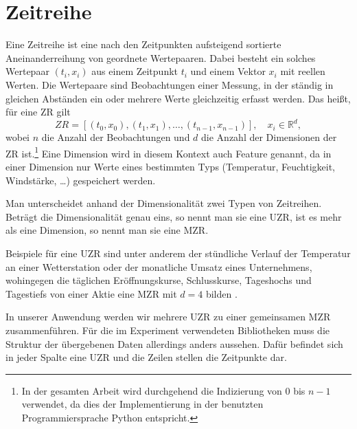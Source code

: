 \section{Zeitreihe}
Eine Zeitreihe ist eine nach den Zeitpunkten aufsteigend sortierte Aneinanderreihung von geordnete Wertepaaren. Dabei besteht ein solches Wertepaar $(t_i, x_i)$ aus einem Zeitpunkt $t_i$ und einem Vektor $x_i$ mit reellen Werten. Die Wertepaare sind Beobachtungen einer Messung, in der ständig in gleichen Abständen ein oder mehrere Werte gleichzeitig erfasst werden. Das heißt, für eine \ac{ZR} gilt 
\[ZR=[(t_0,x_0),(t_1,x_1),\ldots,(t_{n-1},x_{n-1})], \quad x_i \in \mathbb{R}^d,\]
wobei $n$ die Anzahl der Beobachtungen und $d$ die Anzahl der Dimensionen der \acs{ZR} ist.\footnote{In der gesamten Arbeit wird durchgehend die Indizierung von 0 bis $n-1$ verwendet, da dies der Implementierung in der benutzten Programmiersprache Python entspricht.}\label{foot:indexe} Eine Dimension wird in diesem Kontext auch Feature genannt, da in einer Dimension nur Werte eines bestimmten Typs (Temperatur, Feuchtigkeit, Windstärke, \dots) gespeichert werden.

Man unterscheidet anhand der Dimensionalität zwei Typen von Zeitreihen. Beträgt die Dimensionalität genau eins, so nennt man sie eine \ac{UZR}, ist es mehr als eine Dimension, so nennt man sie eine \ac{MZR}.

Beispiele für eine \acs{UZR} sind unter anderem der stündliche Verlauf der Temperatur an einer Wetterstation oder der monatliche Umsatz eines Unternehmens, wohingegen die täglichen Eröffnungskurse, Schlusskurse, Tageshochs und Tagestiefs von einer Aktie eine \acs{MZR} mit $d=4$ bilden \cite[Ch. 3.1]{compressionSurvey}.

In unserer Anwendung werden wir mehrere \acs{UZR} zu einer gemeinsamen \acs{MZR} zusammenführen. Für die im Experiment verwendeten Bibliotheken muss die Struktur der übergebenen Daten allerdings anders aussehen. Dafür befindet sich in jeder Spalte eine \acs{UZR} und die Zeilen stellen die Zeitpunkte dar.